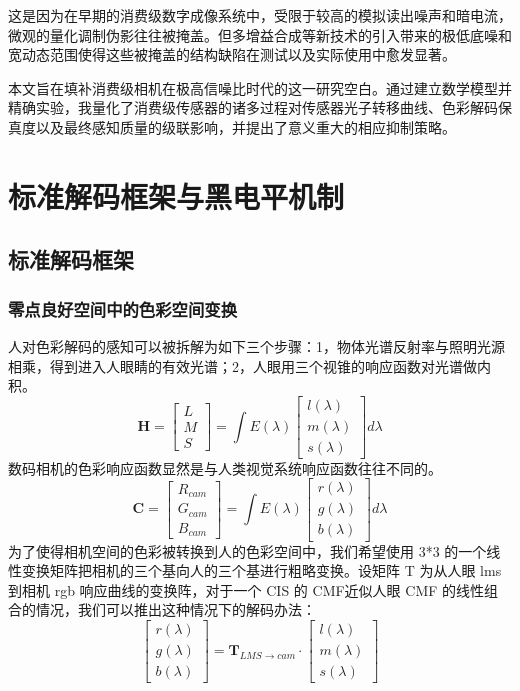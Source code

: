 \documentclass[journal]{IEEEtran}
\begin{document}
这是因为在早期的消费级数字成像系统中，受限于较高的模拟读出噪声和暗电流，微观的量化调制伪影往往被掩盖。但多增益合成等新技术的引入带来的极低底噪和宽动态范围使得这些被掩盖的结构缺陷在测试以及实际使用中愈发显著。

本文旨在填补消费级相机在极高信噪比时代的这一研究空白。通过建立数学模型并精确实验，我量化了消费级传感器的诸多过程对传感器光子转移曲线、色彩解码保真度以及最终感知质量的级联影响，并提出了意义重大的相应抑制策略。


\section{标准解码框架与黑电平机制}


\subsection{标准解码框架}


\subsubsection{零点良好空间中的色彩空间变换}


人对色彩解码的感知可以被拆解为如下三个步骤：1，物体光谱反射率与照明光源相乘，得到进入人眼睛的有效光谱；2，人眼用三个视锥的响应函数对光谱做内积。
\[
\mathbf{H} = \begin{bmatrix} L \\ M \\ S \end{bmatrix} = \int E(\lambda) \begin{bmatrix} l(\lambda) \\ m(\lambda) \\ s(\lambda) \end{bmatrix} d\lambda
\]
数码相机的色彩响应函数显然是与人类视觉系统响应函数往往不同的。
\[
\mathbf{C} = \begin{bmatrix} R_{cam} \\ G_{cam} \\ B_{cam} \end{bmatrix} = \int E(\lambda) \begin{bmatrix} r(\lambda) \\ g(\lambda) \\ b(\lambda) \end{bmatrix} d\lambda
\]
为了使得相机空间的色彩被转换到人的色彩空间中，我们希望使用 3*3 的一个线性变换矩阵把相机的三个基向人的三个基进行粗略变换。设矩阵 T 为从人眼 lms到相机 rgb 响应曲线的变换阵，对于一个 CIS 的 CMF近似人眼 CMF 的线性组合的情况，我们可以推出这种情况下的解码办法：
\[
\begin{bmatrix} r(\lambda) \\ g(\lambda) \\ b(\lambda) \end{bmatrix} = \mathbf{T}_{LMS\to cam} \cdot \begin{bmatrix} l(\lambda) \\ m(\lambda) \\ s(\lambda) \end{bmatrix}
\]
\end{document}
